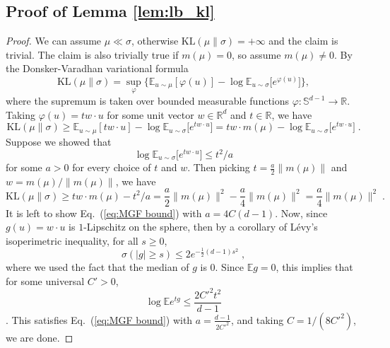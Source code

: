 \documentclass{article}
\newcommand{\E}{\mathbb{E}}
\newcommand{\KL}{\mathrm{KL}}
\newcommand{\R}{\mathbb{R}}
\newcommand{\Sph}{\mathbb{S}}
\renewcommand{\eqref}[1]{Eq.~(\ref{#1})}
\begin{document}
\subsection{Proof of Lemma \ref{lem:lb_kl}}
\label{app:reg_lem_proof}

\begin{proof}
We can assume $\mu \ll \sigma$, otherwise $\KL(\mu\|\sigma)=+\infty$ and the claim is trivial. The claim is also trivially true if $m(\mu)=0$, so assume $m(\mu)\neq 0$. By the Donsker-Varadhan variational formula \citep[Lemma~1.4.3]{dupuis2011weak}
\begin{equation}
\mathrm{KL}(\mu\|\sigma)
=\sup_{\varphi}\Big\{\E_{u\sim\mu}[\varphi(u)]
-\log \E_{u\sim\sigma}\big[e^{\varphi(u)}\big]\Big\},
\end{equation}
where the supremum is taken over bounded measurable functions $\varphi:\Sph^{d-1}\to\R$. Taking $\varphi(u)=t w\cdot u$ for some unit vector $w\in\R^d$ and $t\in\R$, we have 
\begin{equation}
\mathrm{KL}(\mu\|\sigma)\geq
\E_{u\sim\mu}[tw\cdot u]-\log \E_{u\sim \sigma}\big[e^{tw \cdot u}\big] = tw\cdot m(\mu)-\log \E_{u\sim\sigma}\big[e^{tw \cdot u}\big]\;.
\end{equation}
Suppose we showed that 
\begin{equation}\label{eq:MGF bound}
    \log \E_{u\sim\sigma}\big[e^{tw \cdot u}\big]\leq t^2/a
\end{equation}
for some $a>0$ for every choice of $t$ and $w$. Then picking $t=\frac{a}{2}\|m(\mu)\|$ and $w=m(\mu)/\|m(\mu)\|$, we have 
\begin{equation}
    \mathrm{KL}(\mu\|\sigma)\geq tw\cdot m(\mu)-t^2/a = \frac{a}{2}\|m(\mu)\|^2-\frac{a}{4}\|m(\mu)\|^2 = \frac{a}{4}\|m(\mu)\|^2\;.  
\end{equation} 
It is left to show \eqref{eq:MGF bound} with $a=4C(d-1)$.
Now, since $g(u)=w\cdot u$ is $1$-Lipschitz on the sphere, then by a corollary of L\'{e}vy's isoperimetric inequality, 
%
for all $s\ge0$,
\begin{equation}
\sigma\left(|g|\geq s\right)\leq 2e^{-\frac{1}{2}(d-1)s^2}\;,
\end{equation}
where we used the fact that the median of $g$ is $0$. 
Since $\E g=0$, this implies that for some universal $C'>0$, 
\begin{equation}
\log \E e^{tg}\leq\frac{2C'^2 t^2}{d-1}
\end{equation}
\citep[Proposition 2.6.1]{vershynin2018high}.
This satisfies \eqref{eq:MGF bound} with $a=\frac{d-1}{2C'^2}$, and taking $C=1/(8C'^2)$, we are done.
\end{proof}
\end{document}
